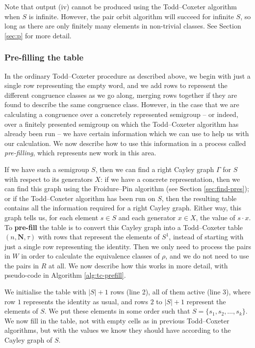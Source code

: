 Note that output (iv) cannot be produced using the Todd--Coxeter algorithm when $S$ is
infinite.  However, the pair orbit algorithm will succeed for infinite $S$, so
long as there are only finitely many elements in non-trivial classes.  See
Section \ref{sec:p} for more detail.

\subsubsection{Pre-filling the table}
\label{sec:tc-prefill}
In the ordinary Todd--Coxeter procedure as described above, we begin with just a
single row representing the empty word, and we add rows to represent the
different congruence classes as we go along, merging rows together if they are
found to describe the same congruence class.  However, in the case that we are
calculating a congruence over a concretely represented semigroup -- or indeed, over a finitely
presented semigroup on which the Todd--Coxeter algorithm has already been run -- we have certain
information which we can use to help us with our calculation.
We now describe how to use this information in a process called
\textit{pre-filling}, which represents new work in this area.

If we have such a semigroup $S$, then we can find a right Cayley graph $\Gamma$
for $S$ with respect to its generators $X$: if we have a concrete representation, then we can find
this graph using the Froidure--Pin algorithm (see Section \ref{sec:find-pres});
or if the Todd--Coxeter algorithm has been run on $S$, then the resulting table contains all
the information required for a right Cayley graph.  Either way, this graph tells us, for
each element $s \in S$ and each generator $x \in X$, the value of $s \cdot x$.
To \textbf{pre-fill} the table is to convert this Cayley graph into a
Todd--Coxeter table $(n, \mathbf{N}, \tau)$ with rows that represent the
elements of $S^1$, instead of starting with just a single row representing the
identity.  Then we only need to process the pairs in $W$ in order to calculate
the equivalence classes of $\rho$, and we do not need to use the pairs in $R$ at
all.  We now describe how this works in more detail, with pseudo-code in
Algorithm \ref{alg:tc-prefill}.

We initialise the table with $|S| + 1$ rows (line 2), all of them active (line
3), where row $1$ represents the identity as usual, and rows $2$ to $|S| + 1$
represent the elements of $S$.  We put these elements in some order such that
$S = \{s_1, s_2, \ldots, s_k\}$.  We now fill in the table, not with empty cells
as in previous Todd--Coxeter algorithms, but with the values we know they should
have according to the Cayley graph of $S$.

